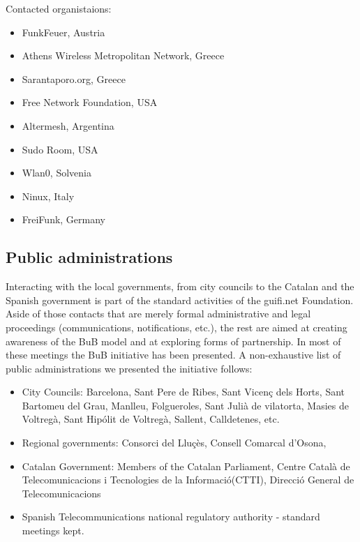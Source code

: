 Contacted organistaions:
\begin{itemize}
  \setlength{\itemindent}{2em}
  \item FunkFeuer, Austria
  \item Athens Wireless Metropolitan Network, Greece
  \item Sarantaporo.org, Greece
  \item Free Network Foundation, USA
  \item Altermesh, Argentina
  \item Sudo Room, USA
  \item Wlan0, Solvenia
  \item Ninux, Italy
  \item FreiFunk, Germany
\end{itemize}


\subsection{Public administrations}

Interacting with the local governments, from city councils to the Catalan and the Spanish government is part of the standard activities of the guifi.net Foundation. Aside of those contacts that are merely formal administrative and legal proceedings (communications, notifications, etc.), the rest are aimed at creating awareness of the BuB model and at exploring forms of partnership. In most of these meetings the BuB initiative has been presented. A non-exhaustive list of public administrations we presented the initiative follows:

\begin{itemize}
  \setlength{\itemindent}{2em}
  \item City Councils: Barcelona, Sant Pere de Ribes, Sant Vicen\c{c} dels Horts, Sant Bartomeu del Grau, Manlleu, Folgueroles, Sant Juli\`{a} de vilatorta, Masies de Voltreg\`{a}, Sant Hip\'{o}lit de Voltreg\`{a}, Sallent, Calldetenes, etc.
  \item Regional governments: Consorci del Llu\c{c}\`{e}s, Consell Comarcal d'Osona, 
  \item Catalan Government: Members of the Catalan Parliament, Centre Catal\`{a} de Telecomunicacions i Tecnologies de la Informaci\'{o}(CTTI), Direcci\'{o} General de Telecomunicacions
  \item Spanish Telecommunications national regulatory authority - standard meetings kept.
\end{itemize}


